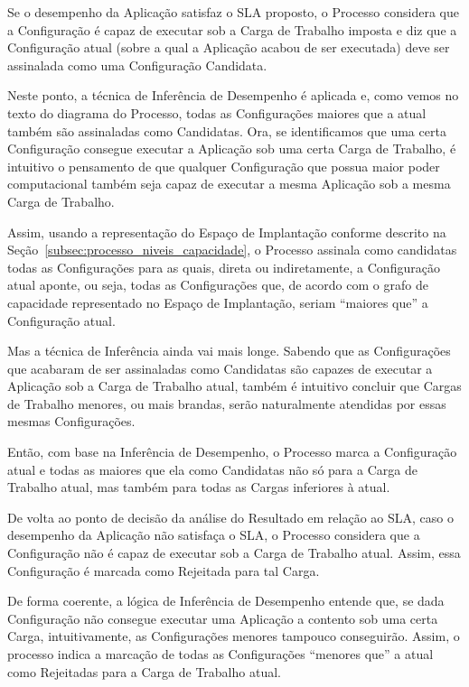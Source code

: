 \documentclass[12pt]{article}
\begin{document}
Se o desempenho da Aplicação satisfaz o SLA proposto, o Processo considera que a
Configuração é capaz de executar sob a Carga de Trabalho imposta e diz que a 
Configuração atual (sobre a qual a Aplicação acabou de ser executada) deve ser
assinalada como uma Configuração Candidata.

Neste ponto, a técnica de Inferência de Desempenho é aplicada e, como vemos
no texto do diagrama do Processo, todas as Configurações maiores que a atual também
são assinaladas como Candidatas. Ora, se identificamos que uma certa Configuração
consegue executar a Aplicação sob uma certa Carga de Trabalho, é intuitivo o 
pensamento de que qualquer Configuração que possua maior poder computacional 
também seja capaz de executar a mesma Aplicação sob a mesma Carga de Trabalho.

Assim, usando a representação do Espaço de Implantação conforme descrito na
Seção~\ref{subsec:processo_niveis_capacidade}, o Processo assinala como candidatas
todas as Configurações para as quais, direta ou indiretamente, a Configuração 
atual aponte, ou seja, todas as Configurações que, de acordo com o grafo de capacidade representado no Espaço de Implantação, seriam ``maiores que'' a Configuração atual. 

Mas a técnica de Inferência ainda vai mais longe. Sabendo que as Configurações
que acabaram de ser assinaladas como Candidatas são capazes de executar a Aplicação
sob a Carga de Trabalho atual, também é intuitivo concluir que Cargas de Trabalho 
menores, ou mais brandas, serão naturalmente atendidas por essas mesmas Configurações.

Então, com base na Inferência de Desempenho, o Processo marca
a Configuração atual e todas as maiores que ela como Candidatas não só para a 
Carga de Trabalho atual, mas também para todas as Cargas inferiores à atual.

De volta ao ponto de decisão da análise do Resultado em relação ao SLA, caso o 
desempenho da Aplicação não satisfaça o SLA, o Processo considera que a 
Configuração não é capaz de executar sob a Carga de Trabalho atual. Assim, essa
Configuração é marcada como Rejeitada para tal Carga.

De forma coerente, a lógica de Inferência de Desempenho entende que, se dada 
Configuração não consegue executar uma Aplicação a contento sob uma certa Carga,
intuitivamente, as Configurações menores tampouco conseguirão. Assim, o processo
indica a marcação de todas as Configurações ``menores que'' a atual como 
Rejeitadas para a Carga de Trabalho atual. 
\end{document}
